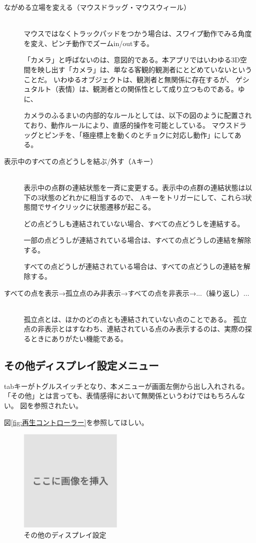 \begin{description}
  \item [ながめる立場を変える（マウスドラッグ・マウスウィール）]\mbox{}\\
  マウスではなくトラックパッドをつかう場合は、スワイプ動作でみる角度を変え、ピンチ動作でズームin/outする。
  
  「カメラ」と呼ばないのは、意図的である。本アプリではいわゆる3D空間を映し出す「カメラ」は、単なる客観的観測者にとどめていないということだ。
  いわゆるオブジェクトは、観測者と無関係に存在するが、
  ゲシュタルト（表情）は、観測者との関係性として成り立つものである。ゆに、

  カメラのふるまいの内部的なルールとしては、以下の図のように配置されており、動作ルールにより、直感的操作を可能としている。
  マウスドラッグとピンチを、「極座標上を動くのとチョクに対応し動作」にしてある。


  
  \item [表示中のすべての点どうしを結ぶ/外す（Aキー）]\mbox{}\\
  表示中の点群の連結状態を一斉に変更する。表示中の点群の連結状態は以下の3状態のどれかに相当するので、
  Aキーをトリガーにして、これら3状態間でサイクリックに状態遷移が起こる。

  どの点どうしも連結されていない場合、すべての点どうしを連結する。

  一部の点どうしが連結されている場合は、すべての点どうしの連結を解除する。

  すべての点どうしが連結されている場合は、すべての点どうしの連結を解除する。

  
  \item [すべての点を表示→孤立点のみ非表示→すべての点を非表示→...（繰り返し）...]\mbox{}\\
  孤立点とは、ほかのどの点とも連結されていない点のことである。
  孤立点の非表示とはすなわち、連結されている点のみ表示するのは、実際の探るときにありがたい機能である。
\end{description}

\subsection{その他ディスプレイ設定メニュー}
tabキーがトグルスイッチとなり、本メニューが画面左側から出し入れされる。
「その他」とは言っても、表情感得において無関係というわけではもちろんない。
図を参照されたい。

図\ref{fig:再生コントローラー}を参照してほしい。
\begin{figure}[h]
  \centering
  \includegraphics[width=5cm]{images/dummy.png}
  \caption{その他のディスプレイ設定}
  \label{fig:その他のディスプレイ設定}
\end{figure}

